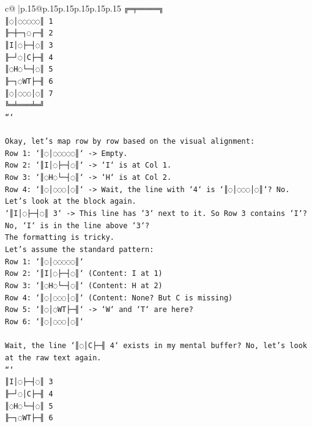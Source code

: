 \documentclass{article}
\begin{document}
{\begin{supertabular}{c@{$\;$}|p{.15\linewidth}@{}p{.15\linewidth}p{.15\linewidth}p{.15\linewidth}p{.15\linewidth}p{.15\linewidth}}
{{{\texttt{╔═╤═════╗} \\
\texttt{║◌│◌◌◌◌◌║ 1} \\
\texttt{╟─┼─┐◌┌─╢ 2} \\
\texttt{║I│◌├─┤◌║ 3} \\
\texttt{╟─┘◌│C├─╢ 4} \\
\texttt{║◌H◌└─┤◌║ 5} \\
\texttt{╟─┐◌WT├─╢ 6} \\
\texttt{║◌│◌◌◌│◌║ 7} \\
\texttt{╚═╧═══╧═╝} \\
\texttt{```} \\
\\ 
\texttt{Okay, let's map row by row based on the visual alignment:} \\
\texttt{Row 1: `║◌│◌◌◌◌◌║` {-}> Empty.} \\
\texttt{Row 2: `║I│◌├─┤◌║` {-}> `I` is at Col 1.} \\
\texttt{Row 3: `║◌H◌└─┤◌║` {-}> `H` is at Col 2.} \\
\texttt{Row 4: `║◌│◌◌◌│◌║` {-}> Wait, the line with `4` is `║◌│◌◌◌│◌║`? No.} \\
\texttt{Let's look at the block again.} \\
\texttt{`║I│◌├─┤◌║ 3` {-}> This line has `3` next to it. So Row 3 contains `I`? No, `I` is in the line above `3`?} \\
\texttt{The formatting is tricky.} \\
\texttt{Let's assume the standard pattern:} \\
\texttt{Row 1: `║◌│◌◌◌◌◌║`} \\
\texttt{Row 2: `║I│◌├─┤◌║` (Content: I at 1)} \\
\texttt{Row 3: `║◌H◌└─┤◌║` (Content: H at 2)} \\
\texttt{Row 4: `║◌│◌◌◌│◌║` (Content: None? But C is missing)} \\
\texttt{Row 5: `║◌│◌WT├─╢` {-}> `W` and `T` are here?} \\
\texttt{Row 6: `║◌│◌◌◌│◌║`} \\
\\ 
\texttt{Wait, the line `║◌│C├─╢ 4` exists in my mental buffer? No, let's look at the raw text again.} \\
\texttt{```} \\
\texttt{║I│◌├─┤◌║ 3} \\
\texttt{╟─┘◌│C├─╢ 4} \\
\texttt{║◌H◌└─┤◌║ 5} \\
\texttt{╟─┐◌WT├─╢ 6} \\
}}}
\end{supertabular}}
\end{document}
